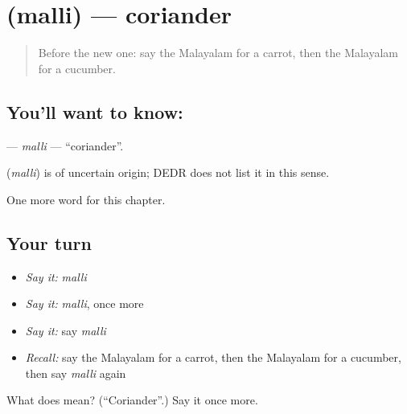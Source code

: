 \section[\texorpdfstring{\ml{മല്ലി} (malli)}{മല്ലി (malli)}]{ (malli) — coriander}

\label{lesson:ML-C323-malli}



\begin{quote}
Before the new one: say the Malayalam for a carrot, then the Malayalam for a cucumber.
\end{quote}

\subsection*{You'll want to know: }
\textbf{} — \emph{malli} — \textquotedblleft{}coriander\textquotedblright{}.

\begin{cousinweb}
\textbf{} (\emph{malli}) is of uncertain origin; DEDR does not list it in this sense.
\end{cousinweb}

\begin{grammarlens}[title={What you've built}]
One more word for this chapter.
\end{grammarlens}

\subsection*{Your turn}
\begin{itemize}
\raggedright
  \item \emph{Say it:} \emph{malli}
  \item \emph{Say it:} \emph{malli}, once more
  \item \emph{Say it:} say \emph{malli}
  \item \emph{Recall:} say the Malayalam for a carrot, then the Malayalam for a cucumber, then say \emph{malli} again
\end{itemize}

\begin{tcolorbox}[breakable,colback=teal!4,colframe=teal!35!black,title={Before you move on}]
What does  mean? (\textquotedblleft{}Coriander\textquotedblright{}.) Say it once more.
\end{tcolorbox}
